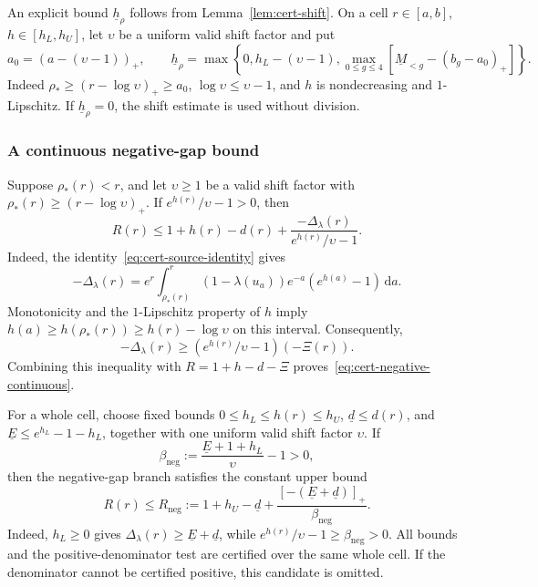 \documentclass[11pt]{article}
\theoremstyle{definition}
\theoremstyle{remark}
\newcommand{\dd}{\,\mathrm d}
\begin{document}
An explicit bound $\underline h_\rho$ follows from Lemma~\ref{lem:cert-shift}.
On a cell $r\in[a,b]$, $h\in[h_L,h_U]$, let $\upsilon$ be a uniform valid
shift factor and put
\begin{equation}\label{eq:cert-Htau-lower}
 a_0=(a-(\upsilon-1))_+,\qquad
 \underline h_\rho=\max\left\{0,h_L-(\upsilon-1),
       \max_{0\le g\le4}[\underline M_{<g}-(b_g-a_0)_+]\right\}.
\end{equation}
Indeed $\rho_*\ge(r-\log\upsilon)_+{}\ge a_0$,
$\log\upsilon\le\upsilon-1$, and $h$ is nondecreasing and $1$-Lipschitz.
If $\underline h_\rho=0$, the shift estimate is used without division.

\subsubsection{A continuous negative-gap bound}
Suppose $\rho_*(r)<r$, and let $\upsilon\ge1$ be a valid shift factor
with $\rho_*(r)\ge(r-\log\upsilon)_+$.
If $e^{h(r)}/\upsilon-1>0$, then
\begin{equation}\label{eq:cert-negative-continuous}
 R(r)\le1+h(r)-d(r)
 +\frac{-\Delta_\lambda(r)}{e^{h(r)}/\upsilon-1}.
\end{equation}
Indeed, the identity~\eqref{eq:cert-source-identity} gives
\[
 -\Delta_\lambda(r)
 =e^r\int_{\rho_*(r)}^r
 (1-\lambda(u_a))e^{-a}(e^{h(a)}-1)\dd a.
\]
Monotonicity and the $1$-Lipschitz property of $h$ imply
$h(a)\ge h(\rho_*(r))\ge h(r)-\log\upsilon$ on this interval.
Consequently,
\[
 -\Delta_\lambda(r)
 \ge(e^{h(r)}/\upsilon-1)(-\Xi(r)).
\]
Combining this inequality with
$R=1+h-d-\Xi$ proves~\eqref{eq:cert-negative-continuous}.

For a whole cell, choose fixed bounds
$0\le h_L\le h(r)\le h_U$, $\underline d\le d(r)$, and
$\underline E\le e^{h_L}-1-h_L$, together with one uniform valid shift
factor $\upsilon$.  If
\[
 \beta_{\mathrm{neg}}:=\frac{\underline E+1+h_L}{\upsilon}-1>0,
\]
then the negative-gap branch satisfies the constant upper bound
\begin{equation}\label{eq:cert-negative-continuous-cell}
 R(r)\le
 R_{\mathrm{neg}}:=1+h_U-\underline d
 +\frac{[-(\underline E+\underline d)]_+}{\beta_{\mathrm{neg}}}.
\end{equation}
Indeed, $h_L\ge0$ gives
$\Delta_\lambda(r)\ge\underline E+\underline d$, while
$e^{h(r)}/\upsilon-1\ge\beta_{\mathrm{neg}}>0$.
All bounds and the positive-denominator test are certified over the
same whole cell.  If the denominator cannot be certified positive,
this candidate is omitted.
\end{document}
